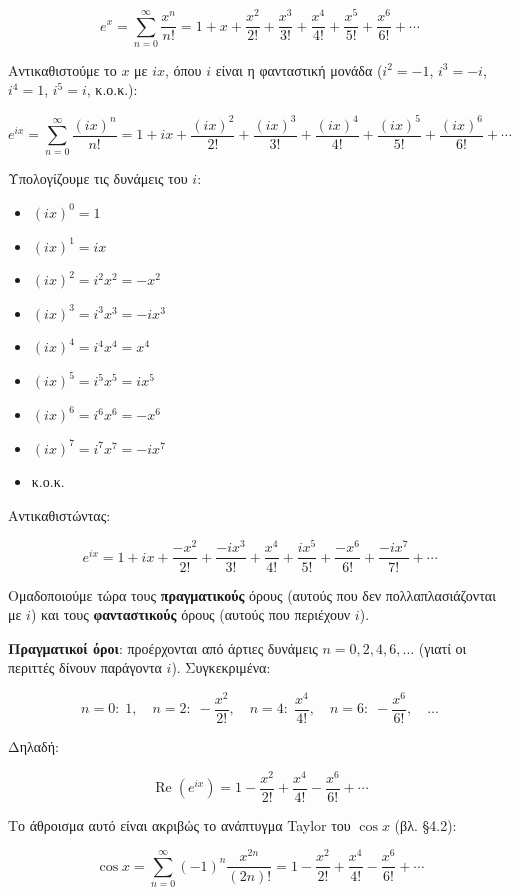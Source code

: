 \documentclass[a4paper, 11pt]{article}
\providecommand{\tightlist}{\setlength{\itemsep}{0pt}\setlength{\parskip}{0pt}}
\begin{document}
\[
e^{x} = \sum_{n=0}^{\infty} \frac{x^n}{n!} = 1 + x + \frac{x^2}{2!} + \frac{x^3}{3!} + \frac{x^4}{4!} + \frac{x^5}{5!} + \frac{x^6}{6!} + \cdots
\]

Αντικαθιστούμε το \(x\) με \(ix\), όπου \(i\) είναι η φανταστική μονάδα
(\(i^2 = -1\), \(i^3 = -i\), \(i^4 = 1\), \(i^5 = i\), κ.ο.κ.):

\[
e^{ix} = \sum_{n=0}^{\infty} \frac{(ix)^n}{n!} = 1 + ix + \frac{(ix)^2}{2!} + \frac{(ix)^3}{3!} + \frac{(ix)^4}{4!} + \frac{(ix)^5}{5!} + \frac{(ix)^6}{6!} + \cdots
\]

Υπολογίζουμε τις δυνάμεις του \(i\):

\begin{itemize}
\tightlist
\item
  \((ix)^0 = 1\)
\item
  \((ix)^1 = i x\)
\item
  \((ix)^2 = i^2 x^2 = -x^2\)
\item
  \((ix)^3 = i^3 x^3 = -i x^3\)
\item
  \((ix)^4 = i^4 x^4 = x^4\)
\item
  \((ix)^5 = i^5 x^5 = i x^5\)
\item
  \((ix)^6 = i^6 x^6 = -x^6\)
\item
  \((ix)^7 = i^7 x^7 = -i x^7\)
\item
  κ.ο.κ.
\end{itemize}

Αντικαθιστώντας:

\[
e^{ix} = 1 + ix + \frac{-x^2}{2!} + \frac{-i x^3}{3!} + \frac{x^4}{4!} + \frac{i x^5}{5!} + \frac{-x^6}{6!} + \frac{-i x^7}{7!} + \cdots
\]

Ομαδοποιούμε τώρα τους \textbf{πραγματικούς} όρους (αυτούς που δεν
πολλαπλασιάζονται με \(i\)) και τους \textbf{φανταστικούς} όρους (αυτούς
που περιέχουν \(i\)).

\textbf{Πραγματικοί όροι}: προέρχονται από άρτιες δυνάμεις
\(n = 0,2,4,6,\dots\) (γιατί οι περιττές δίνουν παράγοντα \(i\)).
Συγκεκριμένα:

\[
n=0:\; 1,\quad n=2:\; -\frac{x^2}{2!},\quad n=4:\; \frac{x^4}{4!},\quad n=6:\; -\frac{x^6}{6!},\quad \dots
\]

Δηλαδή:

\[
\operatorname{Re}(e^{ix}) = 1 - \frac{x^2}{2!} + \frac{x^4}{4!} - \frac{x^6}{6!} + \cdots
\]

Το άθροισμα αυτό είναι ακριβώς το ανάπτυγμα Taylor του \(\cos x\) (βλ.
§4.2):

\[
\cos x = \sum_{n=0}^{\infty} (-1)^n \frac{x^{2n}}{(2n)!} = 1 - \frac{x^2}{2!} + \frac{x^4}{4!} - \frac{x^6}{6!} + \cdots
\]
\end{document}
